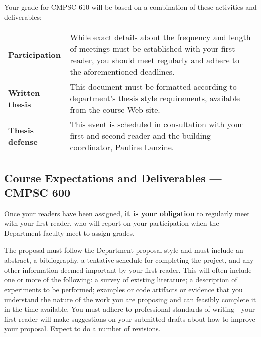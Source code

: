 \vspace*{-.15in}
\noindent
Your grade for CMPSC 610 will be based on a combination of these activities and deliverables:
\begin{center}
\begin{tabular}{lp{4in}}
\bf Participation & While exact details about the frequency and length of meetings must be established with your first
reader, you should meet regularly and adhere to the aforementioned deadlines. \\ 

\bf Written thesis & This document must be formatted according to department's thesis style requirements, available from
the course Web site. \\

\bf Thesis defense & This event is scheduled in consultation with your first and second reader and the building
coordinator, Pauline Lanzine. \\

% 
\end{tabular}
\end{center}

\subsection*{Course Expectations and Deliverables --- CMPSC 600}

\medskip
{}
Once your readers have been assigned,
{\bf it is your obligation} to regularly meet with your first reader,
who will report on your participation when the Department faculty
meet to assign grades.

\medskip
{}
The proposal  must follow the Department proposal style and must include
an abstract, a bibliography, a tentative schedule for completing the
project, and any other information deemed important by your first
reader. This will often include one or more of the following:
a survey of existing literature;
a description of experiments to be performed;
examples or code artifacts or evidence that you understand the
nature of the work you are proposing and can feasibly complete it
in the time available. You must adhere to professional standards of
writing---your first reader will make suggestions on your submitted
drafts about how to improve your proposal.
Expect to do a number of revisions.

